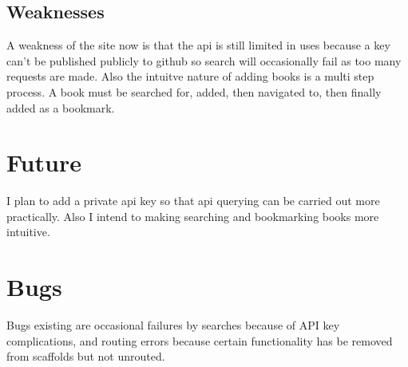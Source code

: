\documentclass[11pt]{article}
\begin{document}
\subsection{Weaknesses}
\label{sec-5-3}

   A weakness of the site now is that the api is still limited in uses because a key can't be published publicly to github so search will occasionally fail as too many requests are made.  Also the intuitve nature of adding books is a multi step process.  A book must be searched for, added, then navigated to, then finally added as a bookmark.
\section{Future}
\label{sec-6}

  I plan to add a private api key so that api querying can be carried out more practically.  Also I intend to making searching and bookmarking books more intuitive.
\section{Bugs}
\label{sec-7}

  Bugs existing are occasional failures by searches because of API key complications, and routing errors because certain functionality has be removed from scaffolds but not unrouted.
\end{document}
